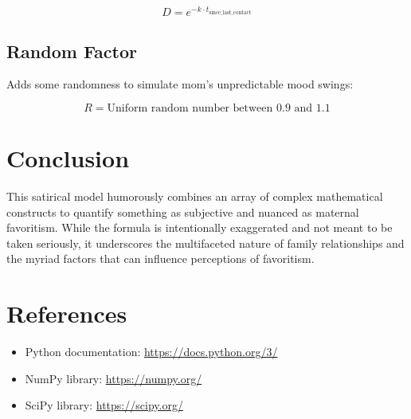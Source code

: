 \documentclass[12pt]{article}
\begin{document}
\begin{equation}
D = e^{-k \cdot t_{\text{since\_last\_contact}}}
\end{equation}

\subsection{Random Factor}
Adds some randomness to simulate mom’s unpredictable mood swings:

\begin{equation}
R = \text{Uniform random number between } 0.9 \text{ and } 1.1
\end{equation}

\section{Conclusion}

This satirical model humorously combines an array of complex mathematical constructs to quantify something as subjective and nuanced as maternal favoritism. While the formula is intentionally exaggerated and not meant to be taken seriously, it underscores the multifaceted nature of family relationships and the myriad factors that can influence perceptions of favoritism.

\section*{References}

\begin{itemize}
    \item Python documentation: \url{https://docs.python.org/3/}
    \item NumPy library: \url{https://numpy.org/}
    \item SciPy library: \url{https://scipy.org/}
\end{itemize}
\end{document}
